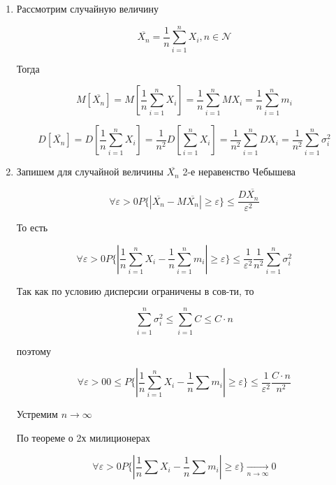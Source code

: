 \begin{enumerate}
    \item Рассмотрим случайную величину

        \begin{equation*}
            \overline{X_n} = \frac{1}{n} \sum_{i=1}^n X_i, n \in \mathcal N
        \end{equation*}

        Тогда

        \begin{equation*}
            M[\overline{X_n}] = M[\frac{1}{n} \sum_{i=1}^n X_i] = \frac{1}{n} \sum_{i=1}^n MX_i = \frac{1}{n} \sum_{i=1}^n m_i
        \end{equation*}

        \begin{equation*}
            D[\overline{X_n}] = D[\frac{1}{n} \sum_{i=1}^n X_i] = \frac{1}{n^2} D[\sum_{i=1}^n X_i] = \frac{1}{n^2} \sum_{i=1}^n DX_i = \frac{1}{n^2} \sum_{i=1}^n \sigma_i^2
        \end{equation*}

    \item Запишем для случайной величины $\overline{X_n}$ 2-е неравенство Чебышева

        \begin{equation*}
            \forall \varepsilon > 0 P\{ |\overline{X_n} - M\overline{X_n} | \geq \varepsilon \} \le \frac{D\overline{X_n}}{\varepsilon^2}
        \end{equation*}

        То есть

        \begin{equation*}
            \forall \varepsilon > 0 P\{ | \frac{1}{n} \sum_{i=1}^n X_i - \frac{1}{n} \sum_{i=1}^n m_i | \geq \varepsilon \} \le \frac{1}{\varepsilon^2}\frac{1}{n^2} \sum_{i=1}^n \sigma^2_i 
        \end{equation*}

        Так как по условию дисперсии ограничены в сов-ти, то

        \begin{equation*}
            \sum_{i=1}^n \sigma_i^2 \le \sum_{i=1}^n C \le C \cdot n
        \end{equation*}

        поэтому

        \begin{equation*}
            \forall \varepsilon > 0 0 \le P \{ | \frac{1}{n} \sum_{i=1}^n X_i - \frac{1}{n} \sum m_i | \geq \varepsilon \} \le \frac{1}{\varepsilon^2} \frac{C \cdot n}{n^2}
        \end{equation*}

        Устремим $n \to \infty$

        По теореме о 2х милиционерах

        \begin{equation*}
            \forall \varepsilon > 0 P\{ |\frac{1}{n} \sum X_i - \frac{1}{n} \sum m_i| \geq \varepsilon \}  \xrightarrow[n\to\infty]{} 0
        \end{equation*}
\end{enumerate}

